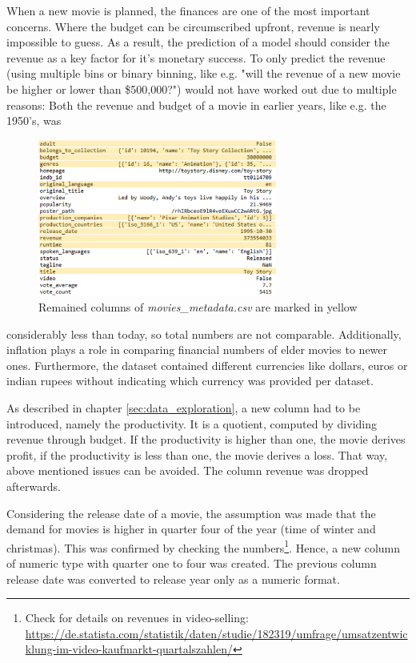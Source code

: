 When a new movie is planned, the finances are one of the most important concerns. Where the budget can be circumscribed upfront, revenue is nearly impossible to guess. As a result, the prediction of a model should consider the revenue as a key factor for it's monetary success. To only predict the revenue (using multiple bins or binary binning, like e.g. "will the revenue of a new movie be higher or lower than \$500,000?") would not have worked out due to multiple reasons: Both the revenue and budget of a movie in earlier years, like e.g. the 1950's, was
\begin{figure}
	\includegraphics[width=0.7\textwidth]{images/3_metadata_columns.png}
	\caption{Remained columns of \textit{movies\_metadata.csv} are marked in yellow}
	\label{img:mm_columns}
\end{figure}
\FloatBarrier
 considerably less than today, so total numbers are not comparable. Additionally, inflation plays a role in comparing financial numbers of elder movies to newer ones. Furthermore, the dataset contained different currencies like dollars, euros or indian rupees without indicating which currency was provided per dataset.
 
As described in chapter \ref{sec:data_exploration}, a new column had to be introduced, namely the productivity. It is a quotient, computed by dividing revenue through budget. If the productivity is higher than one, the movie derives profit, if the productivity is less than one, the movie derives a loss. That way, above mentioned issues can be avoided. The column revenue was dropped afterwards.

Considering the release date of a movie, the assumption was made that the demand for movies is higher in quarter four of the year (time of winter and christmas). This was confirmed by checking the numbers\footnote{Check for details on revenues in video-selling: \hyperref{https://de.statista.com/statistik/daten/studie/182319/umfrage/umsatzentwicklung-im-video-kaufmarkt-quartalszahlen/}{link}{Statista revenue movies}{https://de.statista.com/statistik/daten/studie/182319/umfrage/umsatzentwicklung-im-video-kaufmarkt-quartalszahlen/}}. Hence, a new column of numeric type with quarter one to four was created. The previous column release date was converted to release year only as a numeric format.

